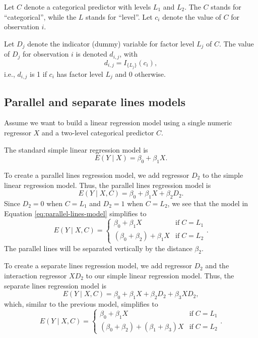 \documentclass[
]{book}
\theoremstyle{definition}
\theoremstyle{definition}
\theoremstyle{definition}
\theoremstyle{definition}
\theoremstyle{remark}
\begin{document}
Let \(C\) denote a categorical predictor with levels \(L_1\) and \(L_2\). The \(C\) stands for ``categorical'', while the \(L\) stands for ``level''. Let \(c_i\) denote the value of \(C\) for observation \(i\).

Let \(D_j\) denote the indicator (dummy) variable for factor level \(L_j\) of \(C\). The value of \(D_j\) for observation \(i\) is denoted \(d_{i,j}\), with
\[
d_{i,j} = I_{\{L_j\}}(c_i),
\]
i.e., \(d_{i,j}\) is 1 if \(c_i\) has factor level \(L_j\) and 0 otherwise.

\hypertarget{parallel-and-separate-lines-models}{%
\subsection{Parallel and separate lines models}\label{parallel-and-separate-lines-models}}

Assume we want to build a linear regression model using a single numeric regressor \(X\) and a two-level categorical predictor \(C\).

The standard simple linear regression model is
\[E(Y\mid X)=\beta_0 + \beta_1 X.\]

To create a parallel lines regression model, we add regressor \(D_2\) to the simple linear regression model. Thus, the parallel lines regression model is
\[
E(Y\mid X,C)=\beta_{0}+\beta_1 X+\beta_2 D_2. \label{eq:parallel-lines-model}
\]
Since \(D_2=0\) when \(C=L_1\) and \(D_2=1\) when \(C=L_2\), we see that the model in Equation \eqref{eq:parallel-lines-model} simplifies to
\[
E(Y\mid X, C) =
\begin{cases}
  \beta_0+\beta_1 X & \mathrm{if}\;C = L_1 \\
  (\beta_0 + \beta_2) +\beta_1 X & \mathrm{if}\;C = L_2
\end{cases}.
\]
The parallel lines will be separated vertically by the distance \(\beta_2\).

To create a separate lines regression model, we add regressor \(D_2\) and the interaction regressor \(X D_2\) to our simple linear regression model. Thus, the separate lines regression model is
\[
E(Y\mid X,C)=\beta_0+\beta_1 X+\beta_2 D_2 + \beta_{3} XD_2,
\]
which, similar to the previous model, simplifies to
\[
E(Y\mid X, C) =
\begin{cases}
  \beta_{0}+\beta_1 X & \mathrm{if}\;C = L_1 \\
  (\beta_{0} + \beta_{2}) +(\beta_1 + \beta_{3}) X & \mathrm{if}\;C = L_2
\end{cases}.
\]
\end{document}

